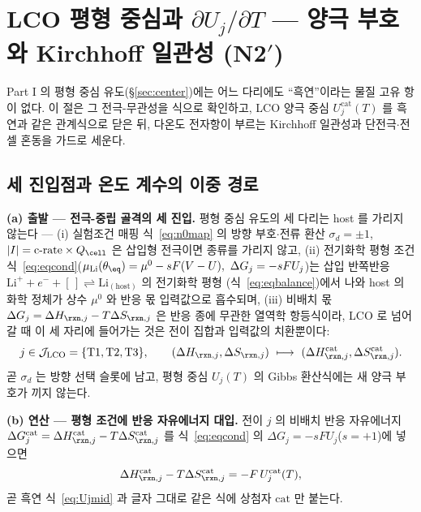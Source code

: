 \section{LCO 평형 중심과 $\partial U_j/\partial T$ --- 양극 부호와 Kirchhoff 일관성 (N2$'$)}\label{sec:lco-center}
Part I 의 평형 중심 유도(\S\ref{sec:center})에는 어느 다리에도 ``흑연''이라는 물질 고유 항이 없다. 이 절은 그
전극-무관성을 식으로 확인하고, LCO 양극 중심 $U_j^\mathrm{cat}(T)$ 를 흑연과 같은 관계식으로 닫은 뒤, 다온도
전자항이 부르는 Kirchhoff 일관성과 단전극$\cdot$전셀 혼동을 가드로 세운다.

\subsection{세 진입점과 온도 계수의 이중 경로}\label{sec:lco-center-deriv}
\textbf{(a) 출발 --- 전극-중립 골격의 세 진입.} 평형 중심 유도의 세 다리는 host 를 가리지 않는다 ---
(i) 실험조건 매핑 식~\eqref{eq:n0map} 의 방향 부호$\cdot$전류 환산
$\sigma_d=\pm1$, $|I|=\text{c-rate}\times Q_\cell$ 은 삽입형 전극이면 종류를 가리지 않고, (ii) 전기화학 평형
조건 식~\eqref{eq:eqcond}($\mu_\mathrm{Li}(\theta_\eq)=\mu^0-sF(V-U),\ \Delta G_j=-sFU_j$)는 삽입
반쪽반응 $\mathrm{Li}^++e^-+[\,]\rightleftharpoons\mathrm{Li}_{(\text{host})}$ 의 전기화학 평형
(식~\eqref{eq:eqbalance})에서 나와 host 의 화학 정체가 상수 $\mu^0$ 와 반응 몫 입력값으로 흡수되며,
(iii) 비배치 몫 $\Delta G_j=\Delta H_{\rxn,j}-T\Delta S_{\rxn,j}$ 은 반응 종에 무관한 열역학 항등식이라,
LCO 로 넘어갈 때 이 세 자리에 들어가는 것은 전이 집합과 입력값의 치환뿐이다:
\begin{equation}
j\in\mathcal J_\mathrm{LCO}=\{\mathrm{T1},\mathrm{T2},\mathrm{T3}\},\qquad
(\Delta H_{\rxn,j},\Delta S_{\rxn,j})\ \longmapsto\
(\Delta H_{\rxn,j}^\mathrm{cat},\Delta S_{\rxn,j}^\mathrm{cat}).
\label{eq:lco-n0sub}
\end{equation}
곧 $\sigma_d$ 는 방향 선택 슬롯에 남고, 평형 중심 $U_j(T)$ 의 Gibbs 환산식에는 새 양극 부호가 끼지 않는다.

\textbf{(b) 연산 --- 평형 조건에 반응 자유에너지 대입.}
전이 $j$ 의 비배치 반응 자유에너지 $\Delta G_j^\mathrm{cat}=\Delta H_{\rxn,j}^\mathrm{cat}
-T\Delta S_{\rxn,j}^\mathrm{cat}$ 를 식~\eqref{eq:eqcond} 의 $\Delta G_j=-sFU_j$($s=+1$)에 넣으면
\[
\Delta H_{\rxn,j}^\mathrm{cat}-T\Delta S_{\rxn,j}^\mathrm{cat}=-F\,U_j^\mathrm{cat}(T),
\]
곧 흑연 식~\eqref{eq:Ujmid} 과 글자 그대로 같은 식에 상첨자 $\mathrm{cat}$ 만 붙는다.

